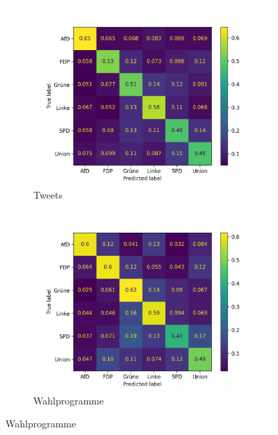 \begin{figure}[H]
    \centering
    \begin{subfigure}{0.49\textwidth}
        \includegraphics[width=\textwidth]{data/images/modeling/baseline/none/tweets_confusion_matrix.png}
        \caption{Tweets}
        \label{sfig:confusionMatrixBaselineTweetsUnbalanced}
    \end{subfigure}
    \hfill
    \begin{subfigure}{0.49\textwidth}
        \includegraphics[width=\textwidth]{data/images/modeling/baseline/none/party_programs_confusion_matrix.png}
        \caption{Wahlprogramme}
        \label{sfig:confusionMatrixBaselineManifestUnbalanced}
    \end{subfigure}

\end{figure}
